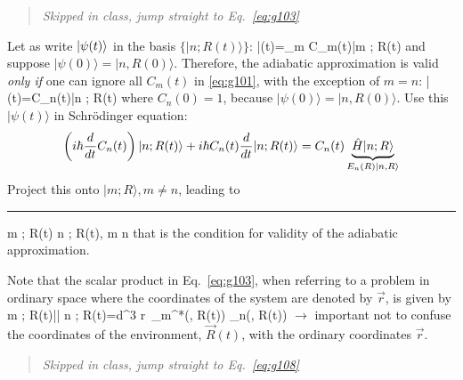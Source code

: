 \documentclass[12pt]{article}
\begin{document}
\begin{quote}\emph{Skipped in class, jump straight to Eq.~\eqref{eq:g103}}\end{quote}

Let as write $\ket{\psi(t)}$ in the basis $\{|n ; R(t)\rangle\}$:
\be
|\psi(t)\rangle=\sum_{m} C_{m}(t)|m ; R(t)\rangle
\label{eq:g101}
\ee
and suppose $|\psi(0)\rangle=|n, R(0)\rangle$. Therefore, the
adiabatic approximation is valid \textit{only if} one
can ignore all $C_m(t)$ in \eqref{eq:g101}, with the exception
of $m=n$:
\be
|\psi(t)\rangle=C_{n}(t)|n ; R(t)\rangle
\ee
where $C_n(0)=1$, because $|\psi(0)\rangle=|n, R(0)\rangle$.
Use this $|\psi(t)\rangle$ in Schrödinger equation:%
\[
\left(i \hbar \frac{d}{d t} C_{n}(t)\right)
|n ; R(t)\rangle+i \hbar C_{n}(t) \frac{d}{d t}|n ; R(t)\rangle=
C_{n}(t) \underbrace{\hat{H}|n ; R\rangle}%
_{E_n(R)\ket{n,R}}
\]
Project this onto $|m ; R\rangle, m \neq n$,
leading to\\
\rule{\textwidth}{1pt}
\be
\left\langle m ; R(t) \mid {} \mid n ; R(t)\right{}, \quad m \neq n
\label{eq:g103}
\ee
that is the condition for validity of the adiabatic approximation.

Note that the scalar product in Eq.~\eqref{eq:g103}, when
referring to a problem in ordinary space where
the coordinates of the system are denoted by $\vec{r}$,
is given by
\be
\left\langle m ; R(t)\left|\right| n ; R(t)\right\rangle=\int d^{3} r\, \psi_{m}^{*}(, R(t))  \psi_{n}(, R(t))
\ee
$\rightarrow$
important not to confuse the
coordinates of the environment, $\vec{R}(t)$,
with the ordinary coordinates $\vec{r}$.

\begin{quote}\emph{Skipped in class, jump straight to Eq.~\eqref{eq:g108}}\end{quote}
\end{document}
